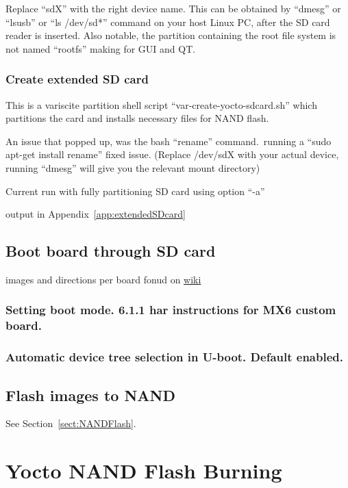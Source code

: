 \documentclass[10pt]{article}
\begin{document}
Replace ``sdX'' with the right device name. This can be obtained by ``dmesg'' or ``lsusb'' or ``ls /dev/sd*'' command on your host Linux PC,
after the SD card reader is inserted.
Also notable, the partition containing the root file system is not named ``rootfs'' making for GUI and QT.\


\subsubsection{Create extended SD card}
This is a variscite partition shell script ``var-create-yocto-sdcard.sh'' which partitions the card and installs necessary files for NAND flash.

An issue that popped up, was the bash ``rename'' command.\ running a ``sudo apt-get install rename'' fixed issue.
(Replace /dev/sdX with your actual device, running ``dmesg'' will give you the relevant mount directory)

Current run with fully partitioning SD card using option ``-a''

output in Appendix~\ref{app:extendedSDcard}

\subsection{Boot board through SD card}
images and directions per board fonud on
\href{http://variwiki.com/index.php?title=Yocto_Build_Release&release=RELEASE_SUMO_V1.1_VAR-SOM-MX6#Boot_the_board_with_a_bootable_SD_card}{wiki}

\subsubsection{Setting boot mode. 6.1.1 har instructions for MX6 custom board.}

\subsubsection{Automatic device tree selection in U-boot. Default enabled.}

\subsection{Flash images to NAND}
See Section~\ref{sect:NANDFlash}.


\section{Yocto NAND Flash Burning\label{sect:NANDFlash}}
\end{document}
